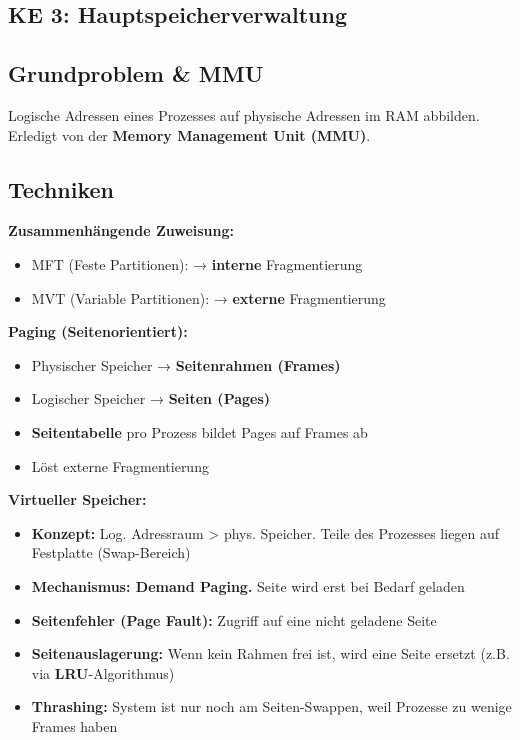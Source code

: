 \documentclass[9pt,a4paper]{extarticle}
\begin{document}
\begin{multicols*}{2}
\section{KE 3: Hauptspeicherverwaltung}

\subsection{Grundproblem \& MMU}
Logische Adressen eines Prozesses auf physische Adressen im RAM abbilden. Erledigt von der \textbf{Memory Management Unit (MMU)}.

\subsection{Techniken}
\textbf{Zusammenhängende Zuweisung:}
\begin{itemize}
\item MFT (Feste Partitionen): → \textbf{interne} Fragmentierung
\item MVT (Variable Partitionen): → \textbf{externe} Fragmentierung
\end{itemize}

\textbf{Paging (Seitenorientiert):}
\begin{itemize}
\item Physischer Speicher → \textbf{Seitenrahmen (Frames)}
\item Logischer Speicher → \textbf{Seiten (Pages)}
\item \textbf{Seitentabelle} pro Prozess bildet Pages auf Frames ab
\item Löst externe Fragmentierung
\end{itemize}

\textbf{Virtueller Speicher:}
\begin{itemize}
\item \textbf{Konzept:} Log. Adressraum > phys. Speicher. Teile des Prozesses liegen auf Festplatte (Swap-Bereich)
\item \textbf{Mechanismus: Demand Paging.} Seite wird erst bei Bedarf geladen
\item \textbf{Seitenfehler (Page Fault):} Zugriff auf eine nicht geladene Seite
\item \textbf{Seitenauslagerung:} Wenn kein Rahmen frei ist, wird eine Seite ersetzt (z.B. via \textbf{LRU}-Algorithmus)
\item \textbf{Thrashing:} System ist nur noch am Seiten-Swappen, weil Prozesse zu wenige Frames haben
\end{itemize}


\end{multicols*}
\end{document}
